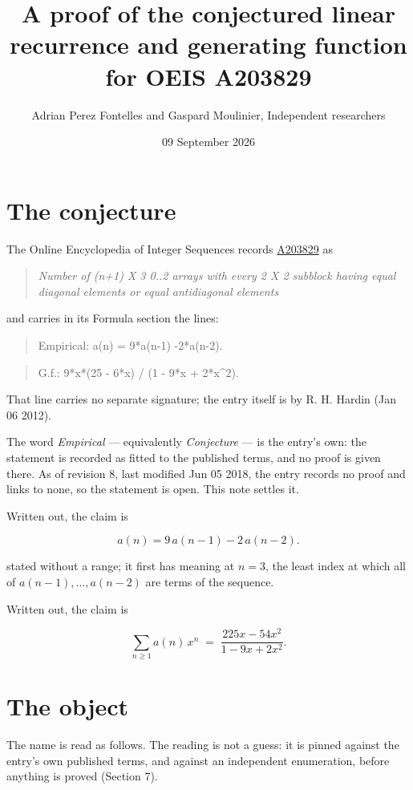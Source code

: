 \documentclass[11pt]{article}
\title{A proof of the conjectured linear recurrence and generating function for OEIS A203829}
\author{Adrian Perez Fontelles and Gaspard Moulinier, Independent researchers}
\date{09 September 2026}
\theoremstyle{definition}
\begin{document}
\maketitle
\section{The conjecture}

The Online Encyclopedia of Integer Sequences records \href{https://oeis.org/A203829}{A203829} as

\begin{quote}\itshape Number of (n+1) X 3 0..2 arrays with every 2 X 2 subblock having equal diagonal elements or equal antidiagonal elements\end{quote}

and carries in its Formula section the lines:

\begin{quote}\ttfamily Empirical: a(n) = 9*a(n-1) -2*a(n-2).\end{quote}

\begin{quote}\ttfamily G.f.: 9*x*(25 - 6*x) / (1 - 9*x + 2*x\textasciicircum{}2).\end{quote}

That line carries no separate signature; the entry itself is by R. H. Hardin (Jan 06 2012).

The word {\itshape Empirical} --- equivalently {\itshape Conjecture} --- is the entry's own: the statement is recorded as fitted to the published terms, and no proof is given there. As of revision 8, last modified Jun 05 2018, the entry records no proof and links to none, so the statement is open. This note settles it.

Written out, the claim is

\[a(n) = 9\,a(n-1) - 2\,a(n-2).\]

stated without a range; it first has meaning at $n = 3$, the least index at which all of $a(n-1),\dots,a(n-2)$ are terms of the sequence.

Written out, the claim is

\[\sum_{n \ge 1} a(n)\,x^n \;=\; \frac{225x - 54x^{2}}{1 - 9x + 2x^{2}}.\]

\section{The object}

The name is read as follows. The reading is not a guess: it is pinned against the entry's own published terms, and against an independent enumeration, before anything is proved (Section 7).
\end{document}
